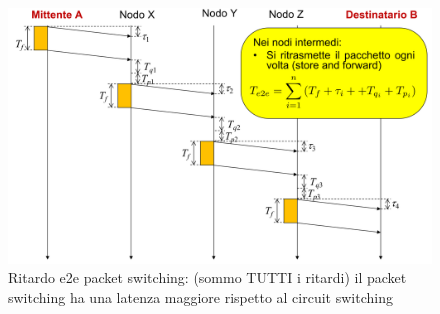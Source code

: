     
    \begin{figure}[h!]
        \centering
        \includegraphics[width=1\textwidth]{images/e2e_packet_switching.png}
        \caption{Ritardo e2e packet switching: (sommo TUTTI i ritardi)
il packet switching ha una latenza maggiore rispetto al circuit switching}
        \label{fig:packet_switching}
    \end{figure}